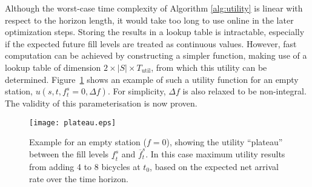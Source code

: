 \documentclass{article}
\providecommand{\Tutil}{T_{\textrm{util}}}
\begin{document}
Although the worst-case time complexity of Algorithm \ref{alg:utility} is linear
with respect to the horizon length, it would take too long to use online in the
later optimization steps. Storing the results in a lookup table is intractable,
especially if the expected future fill levels are treated as continuous values.
However, fast computation can be achieved by constructing a simpler function,
making use of a lookup table of dimension $2\times|S|\times \Tutil$, from which
this utility can be determined. Figure~\ref{fig:plateau} shows an example of
such a utility function for an empty station, $u(s,t,f^s_t=0,\Delta f)$. For
simplicity, $\Delta f$ is also relaxed to be non-integral. The validity of this
parameterisation is now proven.
\begin{figure}
  \centering
  \texttt{[image: plateau.eps]}
  \caption{Example for an empty station ($f=0$), showing the utility ``plateau''
    between the fill levels $\underline f^s_t$ and $\overline f^s_t$. In this case maximum utility results from adding 4 to 8 bicycles at $t_0$, based on the expected net arrival rate over the time horizon.}
  \label{fig:plateau}
\end{figure}
\end{document}
